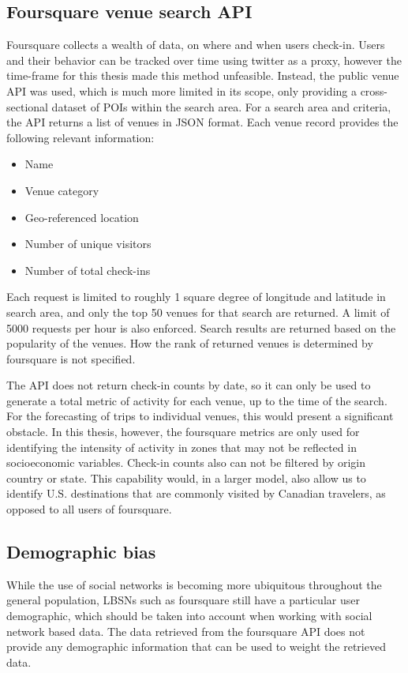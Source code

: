 \subsection{Foursquare venue search API}
Foursquare collects a wealth of data, on where and when users check-in. Users and their behavior can be tracked over time using twitter as a proxy, however the time-frame for this thesis made this method unfeasible. Instead, the public venue API was used, which is much more limited in its scope, only providing a cross-sectional dataset of POIs within the search area. For a search area and criteria, the API returns a list of venues in JSON format. Each venue record provides the following relevant information:
\begin{itemize}
\item Name
\item Venue category
\item Geo-referenced location
\item Number of unique visitors
\item Number of total check-ins
\end{itemize}

Each request is limited to roughly 1 square degree of longitude and latitude in search area, and only the top 50 venues for that search are returned. A limit of 5000 requests per hour is also enforced. Search results are returned based on the popularity of the venues. How the rank of returned venues is determined by foursquare is not specified. 

The API does not return check-in counts by date, so it can only be used to generate a total metric of activity for each venue, up to the time of the search. For the forecasting of trips to individual venues, this would present a significant obstacle. In this thesis, however, the foursquare metrics are only used for identifying the intensity of activity in zones that may not be reflected in socioeconomic variables. Check-in counts also can not be filtered by origin country or state. This capability would, in a larger model, also allow us to identify U.S. destinations that are commonly visited by Canadian travelers, as opposed to all users of foursquare.

\subsection{Demographic bias}
While the use of social networks is becoming more ubiquitous throughout the general population, LBSNs such as foursquare still have a particular user demographic, which should be taken into account when working with social network based data. The data retrieved from the foursquare API does not provide any demographic information that can be used to weight the retrieved data.

